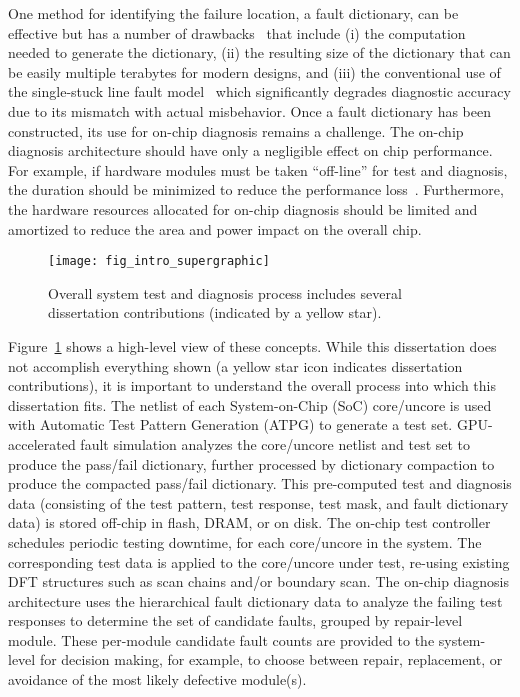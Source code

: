 One method for identifying the failure location, a fault dictionary, can be effective but has a number of drawbacks~\cite{pomeranz97} that include (i) the computation needed to generate the dictionary, (ii) the resulting size of the dictionary that can be easily multiple terabytes for modern designs, and (iii) the conventional use of the single-stuck line fault model~\cite{abramovici90} which significantly degrades diagnostic accuracy due to its mismatch with actual misbehavior.
%
Once a fault dictionary has been constructed, its use for on-chip diagnosis remains a challenge.
%
The on-chip diagnosis architecture should have only a negligible effect on chip performance.
%
For example, if hardware modules must be taken ``off-line'' for test and diagnosis, the duration should be minimized to reduce the performance loss~\cite{li08}.
%
Furthermore, the hardware resources allocated for on-chip diagnosis should be limited and amortized to reduce the area and power impact on the overall chip.

\begin{figure}[hbtp]
\centering
\texttt{[image: fig\_intro\_supergraphic]}
\caption{Overall system test and diagnosis process includes several dissertation contributions (indicated by a yellow star).}
\label{fig:intro_supergraphic}
\end{figure}

Figure~\ref{fig:intro_supergraphic} shows a high-level view of these concepts.
%
While this dissertation does not accomplish everything shown (a yellow star icon indicates dissertation contributions), it is important to understand the overall process into which this dissertation fits.
%
The netlist of each System-on-Chip (SoC) core/uncore is used with Automatic Test Pattern Generation (ATPG) to generate a test set.
%
GPU-accelerated fault simulation analyzes the core/uncore netlist and test set to produce the pass/fail dictionary, further processed by dictionary compaction to produce the compacted pass/fail dictionary.
%
This pre-computed test and diagnosis data (consisting of the test pattern, test response, test mask, and fault dictionary data) is stored off-chip in flash, DRAM, or on disk.
%
The on-chip test controller~\cite{li13} schedules periodic testing downtime, for each core/uncore in the system.
%
The corresponding test data is applied to the core/uncore under test, re-using existing DFT structures such as scan chains and/or boundary scan.
%
The on-chip diagnosis architecture uses the hierarchical fault dictionary data to analyze the failing test responses to determine the set of candidate faults, grouped by repair-level module.
%
These per-module candidate fault counts are provided to the system-level for decision making, for example, to choose between repair, replacement, or avoidance of the most likely defective module(s).


